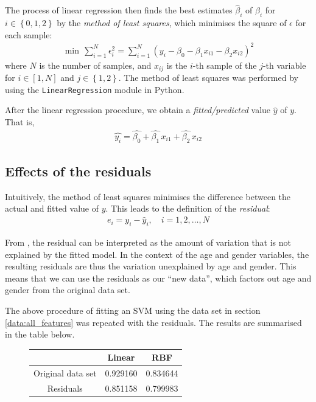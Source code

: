 \documentclass[12pt, twoside, a4paper]{report}
\begin{document}
The process of linear regression then finds the best estimates $\widehat{\beta}_i$ of $\beta_i$ for $i \in \left\lbrace 0,1,2 \right\rbrace$ by the \textit{method of least squares}, which minimises the square of $\epsilon$ for each sample:
\begin{align*}
\min \, \sum_{i=1}^N \epsilon_i^2 = \sum_{i=1}^N \left( y_i - \beta_0 - \beta_1x_{i1} - \beta_2x_{i2} \right)^2
\end{align*}
where $N$ is the number of samples, and $x_{ij}$ is the $i$-th sample of the $j$-th variable for $i \in [1,N]$ and $j \in \left\lbrace 1,2 \right\rbrace$. The method of least squares was performed by using the \texttt{LinearRegression} module in Python.

After the linear regression procedure, we obtain a \textit{fitted/predicted} value $\widehat{y}$ of $y$. That is,
\begin{align*}
\widehat{y_i} = \widehat{\beta_0} + \widehat{\beta_1} \, x_{i1} + \widehat{\beta_2} \, x_{i2}
\end{align*}

\subsection{Effects of the residuals}

Intuitively, the method of least squares minimises the difference between the actual and fitted value of $y$. This leads to the definition of the \textit{residual}:
\begin{align*}
e_i = y_i - \widehat{y}_i, \quad i=1,2,\dots,N
\end{align*}

From \cite{RefWorks:252}, the residual can be interpreted as the amount of variation that is not explained by the fitted model. In the context of the age and gender variables, the resulting residuals are thus the variation unexplained by age and gender. This means that we can use the residuals as our ``new data'', which factors out age and gender from the original data set.

The above procedure of fitting an SVM using the data set in section \ref{data:all_features} was repeated with the residuals. The results are summarised in the table below.

\begin{figure}[h]
\begin{center}
    \begin{tabular}{| c | c | c | } \hline
      & Linear & RBF \\ \hline
    Original data set & 0.929160 & 0.834644 \\ \hline
	Residuals & 0.851158  & 0.799983 \\ \hline
    \end{tabular}
\end{center}
\end{figure}
\end{document}
